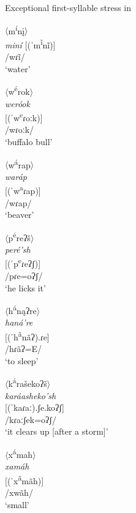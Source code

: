 \largerpage
\begin{exe}
\item\label{hollowdorseystress} Exceptional first-syllable stress in \citet{hollow1970}

\begin{xlist}
\item 	$\langle$m\textsuperscript{í}nį$\rangle$\\
    \textit{miní}
    {[}(ˈm\textsuperscript{ĩ}nĩ)]\\
    /wɾĩ/\\
    `water'

\item 	$\langle$w\textsuperscript{é}rok$\rangle$\\
    \textit{weróok}\\
    {[(ˈw\textsuperscript{e}ɾoːk)]}\\
    /wɾoːk/\\
    `buffalo bull'

\item 	$\langle$w\textsuperscript{á}rap$\rangle$\\
    \textit{waráp}\\
    {[(ˈw\textsuperscript{a}ɾap)]}\\
    /wɾap/\\
    `beaver'

\item 	$\langle$p\textsuperscript{é}reʔš$\rangle$\\
    \textit{peré'sh}\\
    {[(ˈp\textsuperscript{e}ɾeʔʃ)]}\\
    /pɾe=oʔʃ/\\
    `he licks it'

\item $\langle$h\textsuperscript{á}nąʔre$\rangle$\\
    \textit{haná're}\\
    {[(ˈh\textsuperscript{ã}nãʔ).ɾe]}\\
    /hɾãʔ=E/\\
    `to sleep'



\item 		$\langle$k\textsuperscript{á}rašekoʔš$\rangle$\\
    \textit{karáasheko'sh}\\
    {[(ˈkaɾaː).ʃe.koʔʃ]}\\
    /kɾaːʃek=oʔʃ/\\
    `it clears up [after a storm]'

\item 	$\langle$x\textsuperscript{á}mah$\rangle$\\
    \textit{xamáh}\\
    {[(ˈx\textsuperscript{ã}mãh)]}\\
    /xwãh/\\
    `small'
\end{xlist}

\end{exe}

